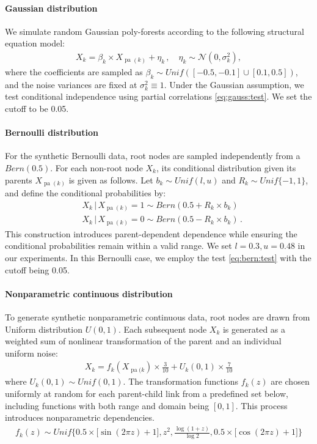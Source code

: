 \documentclass{article}
\theoremstyle{definition}
\theoremstyle{definition}
\theoremstyle{definition}
\theoremstyle{definition}
\theoremstyle{definition}
\theoremstyle{definition}
\theoremstyle{remark}
\theoremstyle{remark}
\newcommand{\given}{\,|\,}
\DeclareMathOperator{\pa}{pa}
\begin{document}
\paragraph{Gaussian distribution}

We simulate random Gaussian poly-forests according to the following structural equation model:
\begin{align*}
    X_k = \beta_k \times X_{\pa(k)} + \eta_k\,, \quad \eta_k\sim \mathcal{N}(0,\sigma_k^2),
\end{align*} 
where the coefficients are sampled as $\beta_k\sim Unif([-0.5,-0.1]\cup [0.1,0.5])$, and the noise variances are fixed at $\sigma^2_k\equiv1$.
Under the Gaussian assumption, we test conditional independence using partial correlations \eqref{eq:gauss:test}. We set the cutoff to be 0.05.





\paragraph{Bernoulli distribution}
For the synthetic Bernoulli data, root nodes are sampled independently from a $Bern(0.5)$.
For each non-root node $X_k$, its conditional distribution given its parents $X_{\pa(k)}$ 
is given as follows. Let $b_k \sim Unif(l,u)$ and $R_k\sim Unif\{-1,1\}$, and define the conditional probabilities by:
\begin{align*}
    & X_k \given X_{\pa(k)} = 1 \sim Bern(0.5 + R_k\times b_k) \\
    & X_k \given X_{\pa(k)} = 0 \sim Bern(0.5 - R_k\times b_k) \,.
\end{align*}
This construction introduces parent-dependent dependence while ensuring the conditional probabilities remain within a valid range. 
We set $l=0.3,u=0.48$ in our experiments.
In this Bernoulli case, we employ the test \eqref{eq:bern:test} with the cutoff being 0.05.


\paragraph{Nonparametric continuous distribution}
To generate synthetic nonparametric continuous data, root nodes are drawn from Uniform distribution $U(0,1)$. Each subsequent node $X_k$ is generated as a weighted sum of nonlinear transformation of the parent and an individual uniform noise:
\begin{align*}
    X_k  =  f_{k}(X_{\pa(k}) \times \frac{3}{10} + U_k(0,1) \times \frac{7}{10}
\end{align*}
where $U_k(0,1)\sim Unif(0,1)$.
The transformation functions $f_{k}(z)$ are chosen uniformly at random for each parent-child link from a predefined set below, including functions with both range and domain being $[0,1]$. This process introduces nonparametric dependencies.
\begin{align*}
    f_{k}(z) \sim Unif\bigg\{0.5\times\Big[\sin(2\pi z)+1\Big], z^2, \frac{\log(1+z)}{\log 2},  0.5\times\Big[\cos(2\pi z)+1\Big]\bigg\}
\end{align*}
\end{document}
